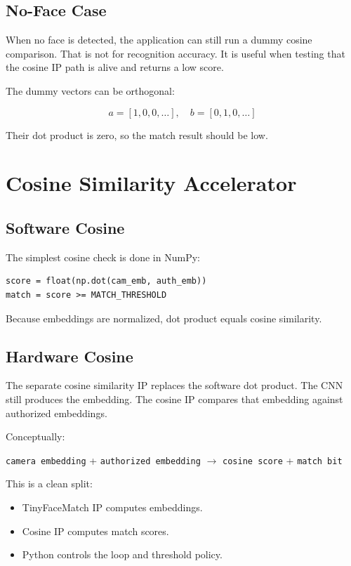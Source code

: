 \documentclass[11pt]{article}
\newcommand{\code}[1]{\texttt{#1}}
\begin{document}
\subsection{No-Face Case}

When no face is detected, the application can still run a dummy cosine comparison.
That is not for recognition accuracy.
It is useful when testing that the cosine IP path is alive and returns a low score.

The dummy vectors can be orthogonal:

\[
  a = [1,0,0,\ldots], \quad b = [0,1,0,\ldots]
\]

Their dot product is zero, so the match result should be low.

\section{Cosine Similarity Accelerator}

\subsection{Software Cosine}

The simplest cosine check is done in NumPy:

\begin{lstlisting}
score = float(np.dot(cam_emb, auth_emb))
match = score >= MATCH_THRESHOLD
\end{lstlisting}

Because embeddings are normalized, dot product equals cosine similarity.

\subsection{Hardware Cosine}

The separate cosine similarity IP replaces the software dot product.
The CNN still produces the embedding.
The cosine IP compares that embedding against authorized embeddings.

Conceptually:

\begin{center}
\code{camera embedding} + \code{authorized embedding}
\(\rightarrow\)
\code{cosine score} + \code{match bit}
\end{center}

This is a clean split:

\begin{itemize}[leftmargin=1.4em]
  \item TinyFaceMatch IP computes embeddings.
  \item Cosine IP computes match scores.
  \item Python controls the loop and threshold policy.
\end{itemize}
\end{document}
